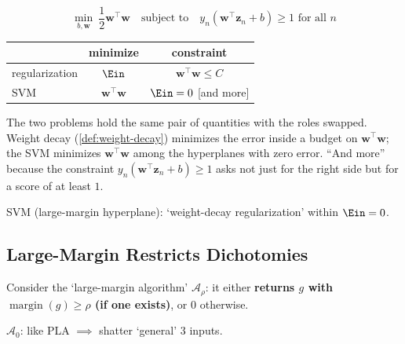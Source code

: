 \[
    \min_{b, \bm{w}} \ \frac{1}{2} \bm{w}^\top \bm{w} \quad \text{subject
    to} \quad y_n (\bm{w}^\top \bm{z}_n + b) \ge 1 \text{ for all } n
\]

\begin{center}
    \solidrules
    \begin{tabular}{l|c|c}
        \toprule
        & minimize & constraint\\
        \midrule
        regularization & \(\Ein\) & \(\bm{w}^\top \bm{w} \le C\)\\
        SVM & \(\bm{w}^\top \bm{w}\) & \(\Ein = 0\) [and more]\\
        \bottomrule
    \end{tabular}
\end{center}

The two problems hold the same pair of quantities with the roles swapped.
Weight decay (\autoref{def:weight-decay}) minimizes the error inside a
budget on \(\bm{w}^\top \bm{w}\); the SVM minimizes \(\bm{w}^\top \bm{w}\)
among the hyperplanes with zero error. ``And more'' because the constraint
\(y_n(\bm{w}^\top \bm{z}_n + b) \ge 1\) asks not just for the right side but
for a score of at least \(1\).

\begin{moral}
    SVM (large-margin hyperplane): `weight-decay regularization' within
    \(\Ein = 0\).
\end{moral}

\subsection{Large-Margin Restricts Dichotomies}

Consider the `large-margin algorithm' \(\mathcal{A}_\rho\): it either
\textbf{returns \(g\) with \(\operatorname{margin}(g) \ge \rho\) (if one
exists)}, or \(0\) otherwise.

\textbf{\(\mathcal{A}_0\)}: like PLA \(\implies\) shatter `general' 3 inputs.
\begin{center}
\end{center}

